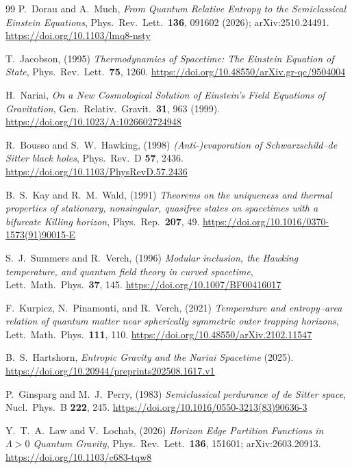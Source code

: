 \documentclass[11pt]{article}
\begin{document}
\begingroup
\footnotesize
\begin{thebibliography}{99}\setlength{\itemsep}{1pt}\setlength{\parskip}{0pt}
 P.~Dorau and A.~Much, \emph{From Quantum Relative Entropy to the Semiclassical Einstein Equations}, Phys.\ Rev.\ Lett.\ \textbf{136}, 091602 (2026); arXiv:2510.24491.
\url{https://doi.org/10.1103/lmq8-nsty}

 T.~Jacobson, (1995) \emph{Thermodynamics of Spacetime: The Einstein Equation of State}, Phys.\ Rev.\ Lett.\ \textbf{75}, 1260.
\url{https://doi.org/10.48550/arXiv.gr-qc/9504004}

 H.~Nariai, \emph{On a New Cosmological Solution of Einstein's Field Equations of Gravitation}, Gen.\ Relativ.\ Gravit.\ \textbf{31}, 963 (1999). \url{https://doi.org/10.1023/A:1026602724948}

 R.~Bousso and S.~W.~Hawking, (1998) \emph{(Anti-)evaporation of Schwarzschild--de Sitter black holes}, Phys.\ Rev.\ D \textbf{57}, 2436.
\url{https://doi.org/10.1103/PhysRevD.57.2436}

 B.~S.~Kay and R.~M.~Wald, (1991) \emph{Theorems on the uniqueness and thermal properties of stationary, nonsingular, quasifree states on spacetimes with a bifurcate Killing horizon}, Phys.\ Rep.\ \textbf{207}, 49.
\url{https://doi.org/10.1016/0370-1573(91)90015-E}

 S.~J.~Summers and R.~Verch, (1996) \emph{Modular inclusion, the Hawking temperature, and quantum field theory in curved spacetime}, Lett.\ Math.\ Phys.\ \textbf{37}, 145.
\url{https://doi.org/10.1007/BF00416017}

 F.~Kurpicz, N.~Pinamonti, and R.~Verch, (2021) \emph{Temperature and entropy--area relation of quantum matter near spherically symmetric outer trapping horizons}, Lett.\ Math.\ Phys.\ \textbf{111}, 110.
\url{https://doi.org/10.48550/arXiv.2102.11547}

 B.~S.~Hartshorn, \emph{Entropic Gravity and the Nariai Spacetime} (2025). \url{https://doi.org/10.20944/preprints202508.1617.v1}

 P.~Ginsparg and M.~J.~Perry, (1983) \emph{Semiclassical perdurance of de Sitter space}, Nucl.\ Phys.\ B \textbf{222}, 245.
\url{https://doi.org/10.1016/0550-3213(83)90636-3}

 Y.~T.~A.~Law and V.~Lochab, (2026) \emph{Horizon Edge Partition Functions in $\Lambda>0$ Quantum Gravity}, Phys.\ Rev.\ Lett.\ \textbf{136}, 151601; arXiv:2603.20913.
\url{https://doi.org/10.1103/c683-tqw8}


\end{thebibliography}
\end{document}
